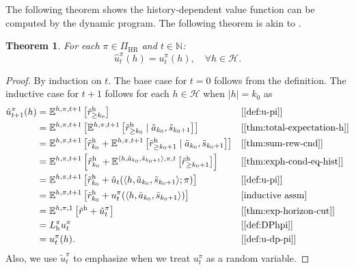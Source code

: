 \documentclass[letterpaper]{article}
\theoremstyle{plain}
\newtheorem{theorem}{Theorem}[subsection]
\theoremstyle{definition}
\theoremstyle{remark}
\newcommand{\Nats}{\mathbb{N}}
\newcommand{\E}{\mathbb{E}}
\newcommand{\PiHR}{\Pi_{\mathrm{HR}}}
\newcommand{\rew}{\tilde{r}^{\mathrm{h}}}
\newcommand{\why}[1]{\text{[#1]}}
\newcommand{\lean}[1]{\textcolor{blue}{(\emph{LEAN}: \texttt{#1})}}
\begin{document}
The following theorem shows the history-dependent value function can be computed by the dynamic program. The following theorem is akin to \citep[theorem~4.2.1]{Puterman2005}.
\begin{theorem} \label{thm:dph-correct-vf}
For each $\pi\in \PiHR$ and $t\in \Nats$:
  \[
    \hat{u}^{\pi}_t(h)
    =
    u^{\pi}_t(h), \quad \forall h\in \mathcal{H}.
  \]
\end{theorem}
\begin{proof}
By induction on $t$. The base case for $t=0$ follows from the definition. The inductive case for $t + 1$ follows for each $h\in \mathcal{H}$ when $|h| = k_0$ as
{\allowdisplaybreaks
\begin{align*}
\hat{u}_{t+1}^{\pi}(h)
&= \E^{h, \pi, t+1} \left[ \rew_{\ge k_0}  \right] && \why{\cref{def:u-pi}}\\
&= \E^{h, \pi, t+1} \left[  \E^{h, \pi, t+1} \left[ \rew_{\ge k_0} \mid \tilde{a}_{k_0}, \tilde{s}_{k_0+1} \right] \right]  && \why{\cref{thm:total-expectation-h}} \\
&= \E^{h, \pi, t+1} \left[\rew_{k_0} +  \E^{h, \pi, t+1} \left[  \rew_{\ge k_0+1} \mid \tilde{a}_{k_0}, \tilde{s}_{k_0+1} \right] \right] && \why{\cref{thm:sum-rew-cnd}} \\
&= \E^{h, \pi, t+1} \left[\rew_{k_0} +  \E^{\langle h,\tilde{a}_{k_0},\tilde{s}_{k_0+1}\rangle, \pi, t} \left[ \rew_{\ge k_0+1} \right]\right] && \why{\cref{thm:exph-cond-eq-hist}} \\
&= \E^{h, \pi, t+1} \left[\rew_{k_0} +  \hat{u}_t(\langle h,\tilde{a}_{k_0},\tilde{s}_{k_0+1}\rangle; \pi) \right] && \why{\cref{def:u-pi}} \\
&= \E^{h, \pi, t+1} \left[\rew_{k_0} +  u^{\pi}_t(\langle h,\tilde{a}_{k_0},\tilde{s}_{k_0+1}\rangle) \right] && \why{inductive assm} \\
&= \E^{h, \pi, 1} \left[\rew +  \tilde{u}^{\pi}_t \right] && \why{\cref{thm:exp-horizon-cut}} \\
&= L_{\mathrm{h}}^{\pi} u_t^{\pi} && \why{\cref{def:DPhpi}} \\
&= u^{\pi}_t(h). && \why{\cref{def:u-dp-pi}}
\end{align*}
}
Also, we use $\tilde{u}_t^{\pi}$ to emphasize when we treat $u^{\pi}_t$ as a random variable. 

\end{proof}
\end{document}
